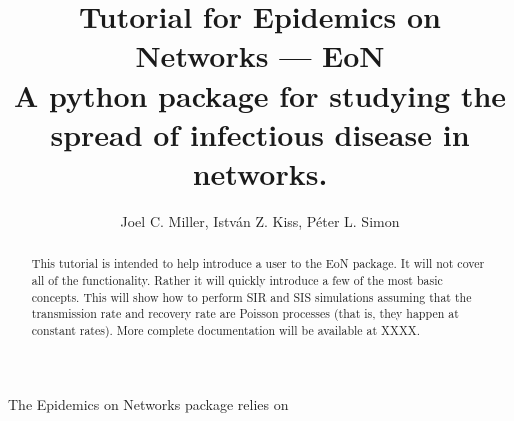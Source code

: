 \documentclass{article}
\title{Tutorial for Epidemics on Networks --- EoN\\ A python package for studying the spread of infectious disease in networks.}
\author{Joel C. Miller, Istv\'{a}n Z. Kiss, P\'{e}ter L. Simon}
\begin{document}
\begin{abstract}
This tutorial is intended to help introduce a user to the EoN package.  It will not cover all of the functionality.  Rather it will quickly introduce a few of the most basic concepts.  This will show how to perform SIR and SIS simulations assuming that the transmission rate and recovery rate are Poisson processes (that is, they happen at constant rates).  More complete documentation will be available at XXXX.  
\end{abstract}

The Epidemics on Networks package relies on 
\end{document}
